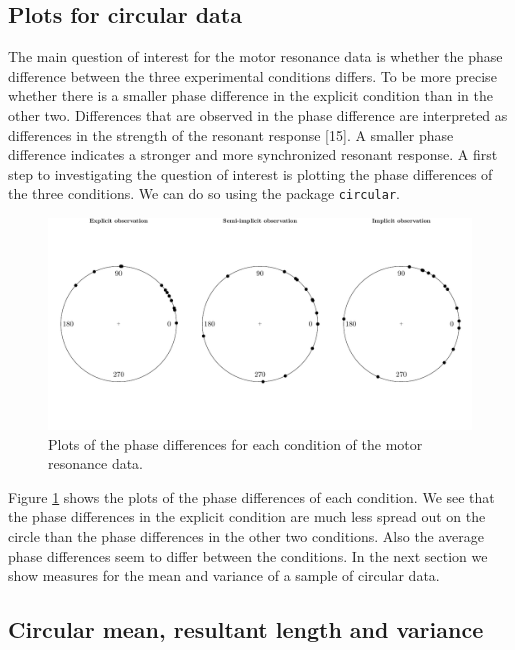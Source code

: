 \documentclass[11pt,]{article}
\begin{document}
\subsection{Plots for circular data}\label{Plots}

The main question of interest for the motor resonance data is whether
the phase difference between the three experimental conditions differs.
To be more precise whether there is a smaller phase difference in the
explicit condition than in the other two. Differences that are observed
in the phase difference are interpreted as differences in the strength
of the resonant response {[}15{]}. A smaller phase difference indicates
a stronger and more synchronized resonant response. A first step to
investigating the question of interest is plotting the phase differences
of the three conditions. We can do so using the package \verb|circular|.

\begin{figure}
        \centering

\includegraphics[width=\textwidth]{plot_motorresonance.pdf}

         \caption{Plots of the phase differences for each condition of the motor resonance data.}
        \label{motorplot}
\end{figure}

Figure \ref{motorplot} shows the plots of the phase differences of each
condition. We see that the phase differences in the explicit condition
are much less spread out on the circle than the phase differences in the
other two conditions. Also the average phase differences seem to differ
between the conditions. In the next section we show measures for the
mean and variance of a sample of circular data.

\subsection{Circular mean, resultant length and variance}\label{MeanVariance}
\end{document}
